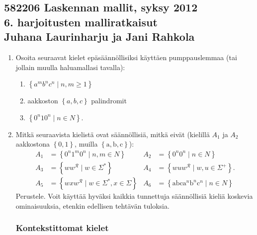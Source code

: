 \documentclass[a4paper,11pt]{article}
\newcommand{\set}[1]{{\left\{ #1 \right\}}}
\begin{document}
\subsection*{582206 Laskennan mallit, syksy 2012 \\
  \textmd{6. harjoitusten malliratkaisut \\
    Juhana Laurinharju ja Jani Rahkola}}

\begin{enumerate}

  \subsubsection*{Säännölliset kielet}

\item
  Osoita seuraavat kielet epäsäännöllisiksi käyttäen
  pumppauslemmaa (tai jollain muulla haluamallasi tavalla):
  \begin{enumerate}
  \item
    $\set{a^m b^n c^n\mid n,m\geq 1}$
  \item
    aakkoston $\set{a,b, c}$ palindromit
  \item
    $\set{0^n10^n\mid n\in N}$.
  \end{enumerate}

\item
  Mitkä seuraavista kielistä ovat säännöllisiä, mitkä
  eivät (kielillä $A_1$ ja $A_2$ aakkostona $\set{0,1}$, muilla
  $\set{\mathrm{a},\mathrm{b},\mathrm{c}}$):
  \begin{align*}
    A_1 &=\set{0^n1^m0^n\mid n,m\in N}
    &A_2 &=\set{0^n0^n\mid n\in N}
    \\
    A_3 &=\set{ww^\mathcal{R}\mid w\in\Sigma^{\ast}}
    &A_4 &=\set{wuw^\mathcal{R}\mid w,u\in\Sigma^+}.
    \\
    A_5 &=\set{wxw^\mathcal{R}\mid w\in\Sigma^{\ast},x\in\Sigma}
    &A_6 &=\set{\mathrm{abc}\mathrm{a}^n\mathrm{b}^n\mathrm{c}^n\mid n\in N}
  \end{align*}
  Perustele. Voit käyttää hyväksi kaikkia tunnettuja säännöllisiä kieliä
  koskevia ominaisuuksia, etenkin edellisen tehtävän tuloksia.

  \subsubsection*{Kontekstittomat kielet}


\end{enumerate}
\end{document}
